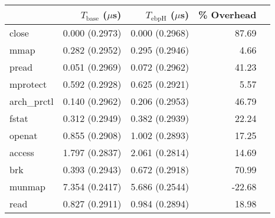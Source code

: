 \begin{tabular}{>{\ttfamily}lrrrr}
\toprule
\multicolumn{1}{l}{System Call} & $T_{\text{base}}$ ($\mu$s) & $T_{\text{ebpH}}$ ($\mu$s) &  \% Overhead \\
\midrule
                          close &             0.000 (0.2973) &             0.000 (0.2968) &        87.69 \\
                           mmap &             0.282 (0.2952) &             0.295 (0.2946) &         4.66 \\
                          pread &             0.051 (0.2969) &             0.072 (0.2962) &        41.23 \\
                       mprotect &             0.592 (0.2928) &             0.625 (0.2921) &         5.57 \\
                    arch\_prctl &             0.140 (0.2962) &             0.206 (0.2953) &        46.79 \\
                          fstat &             0.312 (0.2949) &             0.382 (0.2939) &        22.24 \\
                         openat &             0.855 (0.2908) &             1.002 (0.2893) &        17.25 \\
                         access &             1.797 (0.2837) &             2.061 (0.2814) &        14.69 \\
                            brk &             0.393 (0.2943) &             0.672 (0.2918) &        70.99 \\
                         munmap &             7.354 (0.2417) &             5.686 (0.2544) &       -22.68 \\
                           read &             0.827 (0.2911) &             0.984 (0.2894) &        18.98 \\
\bottomrule
\end{tabular}
